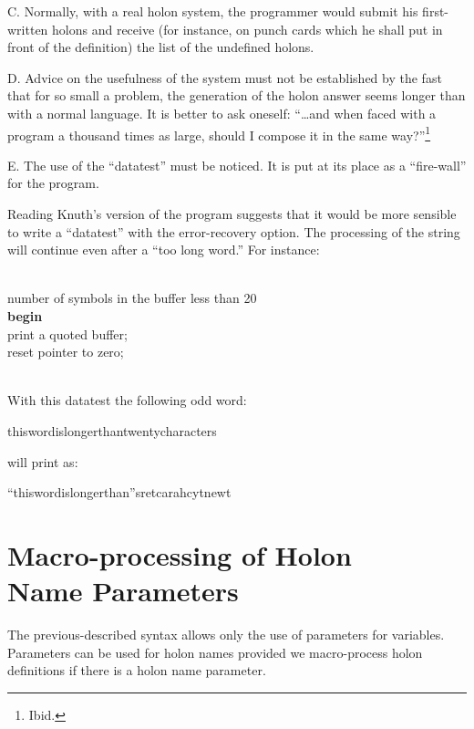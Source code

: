 \documentclass[openany,nobib]{tufte-book}
\newcommand{\kw}[1]{{\bf #1}}
\newcommand{\ind}[1]{\-\hspace{\dimexpr 2mm*#1\relax}}
\begin{document}
\medskip\noindent
C. Normally, with a real holon system, the programmer would submit his
first-written holons and receive (for instance, on punch cards which he shall
put in front of the definition) the list of the undefined holons.

\medskip\noindent
D. Advice on the usefulness of the system must not be established by the fast
that for so small a problem, the generation of the holon answer seems longer
than with a normal language. It is better to ask oneself: ``\dots and when
faced with a program a thousand times as large, should I compose it in the same
way?''\footnote{Ibid.}

\medskip\noindent
E. The use of the ``datatest'' must be noticed. It is put at its place as a
``fire-wall'' for the program.

Reading Knuth's version of the program suggests that it would be more sensible
to write a ``datatest'' with the error-recovery
option.\autocite{knuth1973review} The processing of the string will continue
even after a ``too long word.'' For instance:

\bigskip\noindent
\ind{1}\kw{datatest}\\
\ind{2}number of symbols in the buffer less than 20\\
\ind{2}\kw{else} \kw{begin} \\
\ind{3}print a quoted buffer;\\
\ind{3}reset pointer to zero;\\
\ind{2}\kw{end} \\
\ind{1}\kw{end}

\bigskip\noindent
With this datatest the following odd word:

\medskip
\ind{1}thiswordislongerthantwentycharacters

\medskip\noindent
will print as:

\medskip
\ind{1}``thiswordislongerthan''sretcarahcytnewt

\bigskip{}

\chapter[Macro-processing of Holon Name Parameters]{Macro-processing of Holon
\\ Name Parameters}

The previous-described syntax allows only the use of parameters for variables.
Parameters can be used for holon names provided we macro-process holon
definitions if there is a holon name parameter.
\end{document}
